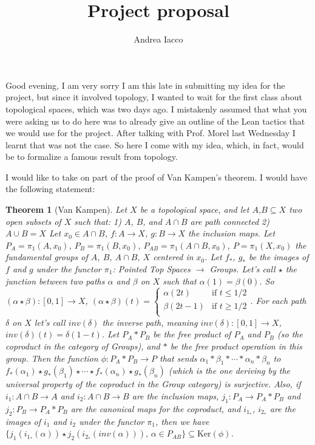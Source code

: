 \documentclass[12pt,a4paper]{article}
\title{Project proposal}
\author{Andrea Iacco}
\newtheorem*{theorem}{Theorem}
\begin{document}
\maketitle

Good evening, I am very sorry I am this late in submitting my idea for the project, but since it involved topology, I wanted to wait for the first class about topological spaces, which was two days ago.
I mistakenly assumed that what you were asking us to do here was to already give an outline of the Lean tactics that we would use for the project. After talking with Prof. Morel last Wednesday I learnt that 
was not the case. So here I come with my idea, which, in fact, would be to formalize a famous result from topology.

I would like to take on part of the proof of Van Kampen's theorem. I would have the following statement:
\begin{theorem}[Van Kampen]
Let $X$ be a topological space, and let $A$,$B \subseteq X$ two open subsets of $X$ such that:
1) $A$, $B$, and $A \cap B$ are path connected
2) $A \cup B = X$
Let $x_0 \in A \cap B$, $f: A \to X$, $g: B \to X$ the inclusion maps. Let $P_A = \pi_1 (A,x_0)$, $P_B = \pi_1 (B,x_0)$, $P_{AB} = \pi_1 (A \cap B,x_0)$, $P = \pi_1 (X,x_0)$ the fundamental groups of $A$, $B$, $A \cap B$, $X$ centered in $x_0$.
Let $f_\ast$, $g_\ast$ be the images of $f$ and $g$ under the functor $\pi_1$: Pointed Top Spaces $\to$ Groups. Let's call $\star$ the junction between two paths $\alpha$ and $\beta$ on $X$ such that $\alpha(1) = \beta(0)$. 
So $(\alpha \star \beta): [0,1] \to X$, $(\alpha \star \beta)(t) = \begin{cases}
\alpha(2t) & \text{if } t \leq 1/2\\ 
\beta(2t-1) & \text{if } t \geq 1/2\\
\end{cases}$. For each path $\delta$ on $X$ let's call $inv(\delta)$ the inverse path,
meaning $inv(\delta): [0,1] \to X$, $inv(\delta)(t) = \delta(1-t)$. 
Let $P_A \ast P_B$ be the free product of $P_A$ and $P_B$ (so the coproduct in the category of Groups), and $\ast$ be the free product operation in this group. Then the function $\phi: P_A \ast P_B \to P$ that sends 
$\alpha_1 \ast \beta_1 \ast \cdots \ast \alpha_n \ast \beta_n$ to $f_\ast (\alpha_1) \star g_\ast (\beta_1) \star \cdots \star f_\ast (\alpha_n) \star g_\ast (\beta_n)$ (which is the one deriving by the universal property of 
the coproduct in the Group category) is surjective.
Also, if $i_1: A \cap B \to A$ and $i_2 : A \cap B \to B$ are the inclusion maps, $j_1: P_A \to P_A \ast P_B$ and $j_2: P_B \to P_A \ast P_B$ are the canonical maps for the coproduct, 
and $i_{1_\ast}$, $i_{2_\ast}$ are the images of $i_1$ and $i_2$ under the functor $\pi_1$, then we have $\{j_1(i_{1_\ast}(\alpha)) \star j_2(i_{2_\ast}(inv(\alpha))),\, \alpha \in P_{AB}\} \subseteq \mathrm{Ker}(\phi)$.
\end{theorem}
\end{document}
